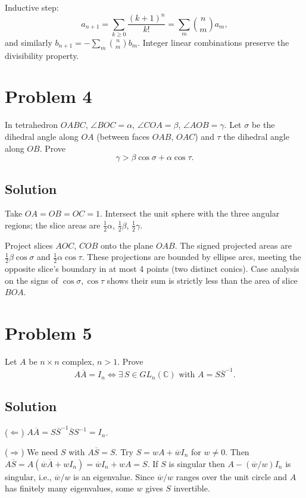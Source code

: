 \documentclass{article}
\begin{document}
Inductive step:
\[a_{n+1}=\sum_{k\ge 0}\frac{(k+1)^n}{k!}=\sum_m\binom{n}{m}a_m,\]
and similarly $b_{n+1}=-\sum_m \binom{n}{m}b_m$. Integer linear combinations preserve the divisibility property.

\section*{Problem 4}
In tetrahedron $OABC$, $\angle BOC=\alpha$, $\angle COA=\beta$, $\angle AOB=\gamma$. Let $\sigma$ be the dihedral angle along $OA$ (between faces $OAB$, $OAC$) and $\tau$ the dihedral angle along $OB$. Prove
\[\gamma > \beta\cos\sigma + \alpha\cos\tau.\]

\subsection*{Solution}
Take $OA=OB=OC=1$. Intersect the unit sphere with the three angular regions; the slice areas are $\frac12\alpha$, $\frac12\beta$, $\frac12\gamma$.

Project slices $AOC$, $COB$ onto the plane $OAB$. The signed projected areas are $\frac12\beta\cos\sigma$ and $\frac12\alpha\cos\tau$. These projections are bounded by ellipse arcs, meeting the opposite slice's boundary in at most 4 points (two distinct conics). Case analysis on the signs of $\cos\sigma,\cos\tau$ shows their sum is strictly less than the area of slice $BOA$.

\section*{Problem 5}
Let $A$ be $n\times n$ complex, $n>1$. Prove
\[A\overline A = I_n \iff \exists\, S\in GL_n(\mathbb{C})\text{ with }A=S\overline S^{-1}.\]

\subsection*{Solution}
($\Leftarrow$) $A\overline A = S\overline S^{-1}\overline S S^{-1}=I_n$.

($\Rightarrow$) We need $S$ with $A\overline S = S$. Try $S = wA + \overline w I_n$ for $w\ne 0$. Then $A\overline S = A(\overline w\overline A + wI_n) = \overline w I_n + wA = S$. If $S$ is singular then $A - (\overline w/w)I_n$ is singular, i.e., $\overline w/w$ is an eigenvalue. Since $\overline w/w$ ranges over the unit circle and $A$ has finitely many eigenvalues, some $w$ gives $S$ invertible.
\end{document}
